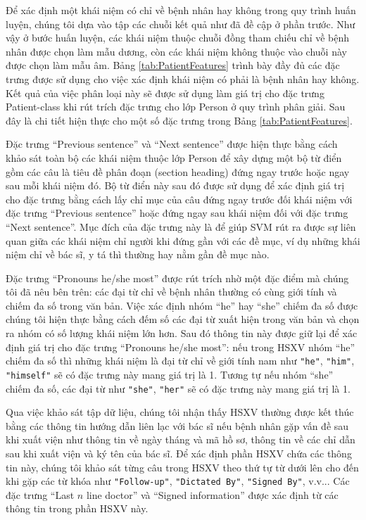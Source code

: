 Để xác định một khái niệm có chỉ về bệnh nhân hay không trong quy trình huấn luyện, chúng tôi dựa vào tập các chuỗi kết quả như đã đề cập ở phần trước. Như vậy ở bước huấn luyện, các khái niệm thuộc chuỗi đồng tham chiếu chỉ về bệnh nhân được chọn làm mẫu dương, còn các khái niệm không thuộc vào chuỗi này được chọn làm mẫu âm. Bảng \ref{tab:PatientFeatures} trình bày đầy đủ các đặc trưng được sử dụng cho việc xác định khái niệm có phải là bệnh nhân hay không. Kết quả của việc phân loại này sẽ được sử dụng làm giá trị cho đặc trưng Patient-class khi rút trích đặc trưng cho lớp Person ở quy trình phân giải. Sau đây là chi tiết hiện thực cho một số đặc trưng trong Bảng \ref{tab:PatientFeatures}.

Đặc trưng ``Previous sentence'' và ``Next sentence'' được hiện thực bằng cách khảo sát toàn bộ các khái niệm thuộc lớp Person để xây dựng một bộ từ điển gồm các câu là tiêu đề phân đoạn (section heading) đứng ngay trước hoặc ngay sau mỗi khái niệm đó. Bộ từ điển này sau đó được sử dụng để xác định giá trị cho đặc trưng bằng cách lấy chỉ mục của câu đứng ngay trước đối khái niệm với đặc trưng ``Previous sentence'' hoặc đứng ngay sau khái niệm đối với đặc trưng ``Next sentence''. Mục đích của đặc trưng này là để giúp SVM rút ra được sự liên quan giữa các khái niệm chỉ người khi đứng gần với các đề mục, ví dụ những khái niệm chỉ về bác sĩ, y tá thì thường hay nằm gần đề mục nào.

Đặc trưng ``Pronouns he/she most'' được rút trích nhờ một đặc điểm mà chúng tôi đã nêu bên trên: các đại từ chỉ về bệnh nhân thường có cùng giới tính và chiếm đa số trong văn bản. Việc xác định nhóm ``he'' hay ``she'' chiếm đa số được chúng tôi hiện thực bằng cách đếm số các đại từ xuất hiện trong văn bản và chọn ra nhóm có số lượng khái niệm lớn hơn. Sau đó thông tin này được giữ lại để xác định giá trị cho đặc trưng ``Pronouns he/she most'': nếu trong HSXV nhóm ``he'' chiếm đa số thì những khái niệm là đại từ chỉ về giới tính nam như \texttt{"he"}, \texttt{"him"}, \texttt{"himself"} sẽ có đặc trưng này mang giá trị là 1. Tương tự nếu nhóm ``she'' chiếm đa số, các đại từ như \texttt{"she"}, \texttt{"her"} sẽ có đặc trưng này mang giá trị là 1.

Qua việc khảo sát tập dữ liệu, chúng tôi nhận thấy HSXV thường được kết thúc bằng các thông tin hướng dẫn liên lạc với bác sĩ nếu bệnh nhân gặp vấn đề sau khi xuất viện như thông tin về ngày tháng và mã hồ sơ, thông tin về các chỉ dẫn sau khi xuất viện và ký tên của bác sĩ. Để xác định phần HSXV chứa các thông tin này, chúng tôi khảo sát từng câu trong HSXV theo thứ tự từ dưới lên cho đến khi gặp các từ khóa như \texttt{"Follow-up"}, \texttt{"Dictated By"}, \texttt{"Signed By"}, v.v... Các đặc trưng ``Last $n$ line doctor'' và ``Signed information'' được xác định từ các thông tin trong phần HSXV này.

